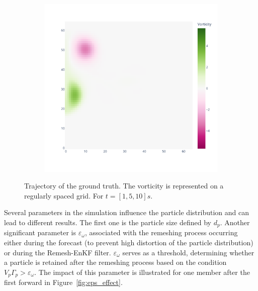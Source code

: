 \begin{figure}[htbp]
\begin{subfigure}{0.32\textwidth}
	\end{subfigure}
	\hfill
	\begin{subfigure}{0.32\textwidth}
		\includegraphics[width=\linewidth]{images/app2d/best_estimate_20.pdf}
	\end{subfigure}
	\caption{Trajectory of the ground truth. The vorticity is represented on a regularly spaced grid. For $t=[1, 5, 10]s.$}
	\label{fig:ref_trajectory}
\end{figure}
Several parameters in the simulation influence the particle distribution and can lead to different results. The first one is the particle size defined by $d_p$. Another significant parameter is $\varepsilon_\omega$, associated with the remeshing process occurring either during the forecast (to prevent high distortion of the particle distribution) or during the Remesh-EnKF filter. $\varepsilon_\omega$ serves as a threshold, determining whether a particle is retained after the remeshing process based on the condition $V_p \Gamma_p > \varepsilon_\omega$. The impact of this parameter is illustrated for one member after the first forward in Figure~\ref{fig:eps_effect}.


